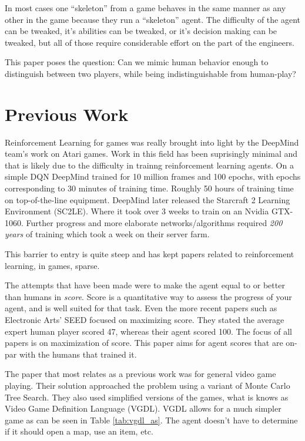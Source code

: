 \documentclass[12pt]{thesis}
\begin{document}
In most cases one ``skeleton'' from a game behaves in the same manner as any 
other in the game because they run a ``skeleton'' agent. The difficulty of the 
agent can be tweaked, it's abilities can be tweaked, or it's decision making 
can be tweaked, but all of those require considerable effort on the part of the 
engineers.

This paper poses the question: Can we mimic human behavior enough to 
distinguish between two players, while being indistinguishable from human-play?



\chapter{Previous Work}
Reinforcement Learning for games was really brought into light by the DeepMind 
team's work on Atari games\cite{Atari_DM}. Work in this field has been 
suprisingly minimal and that is likely due to the difficulty in trainng 
reinforcement learning agents. On a simple DQN DeepMind trained for 10 million 
frames and 100 epochs, with epochs corresponding to 30 minutes of training time. 
Roughly 50 hours of training time on top-of-the-line equipment. DeepMind later 
released the Starcraft 2 Learning Environment (SC2LE)\cite{SC2LE}. Where it 
took over 3 weeks to train on an Nvidia GTX-1060. Further progress and more 
elaborate networks/algorithms required \textit{200 years} of training which 
took a week on their server farm.

This barrier to entry is quite steep and has kept papers related to 
reinforcement learning, in games, sparse.

The attempts that have been made were to make the agent equal to or better than 
humans in \textit{score}. Score is a quantitative way to assess the progress of 
your agent, and is well suited for that task. Even the more recent papers such 
as Electronic Arts' SEED\cite{EA_SEED} focused on maximizing score. They stated 
the average expert human player scored 47, whereas their agent scored 100. The 
focus of all papers is on maximization of score. This paper aims for agent 
scores that are on-par with the humans that trained it.

The paper that most relates as a previous work was for general video game 
playing\cite{Human-Like}. Their solution approached the problem using a variant 
of Monte Carlo Tree Search. They also used simplified versions of the games, 
what is knows as Video Game Definition Language (VGDL). VGDL allows for a much 
simpler game as can be seen in Table \ref{tab:vgdl_as}. The agent doesn't have 
to determine if it should open a map, use an item, etc. 
\end{document}
